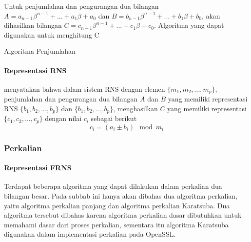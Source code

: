 Untuk penjumlahan dan pengurangan dua bilangan $A = a_{n-1}\beta^{n-1}+...+a_{1}\beta+a_{0}$ dan $B = b_{n-1}\beta^{n-1}+...+b_{1}\beta+b_{0}$, akan dihasilkan bilangan $C = c_{n-1}\beta^{n-1}+...+c_{1}\beta+c_{0}$. Algoritma yang dapat digunakan untuk menghitung C

\begin{algorithm}
  \caption{Algoritma Penjumlahan}
    \label{alg:add}
  \begin{algorithmic}[1]
    \Statex
      \EndFor
      \State {}
    \EndFunction
  \end{algorithmic}
\end{algorithm}




\paragraph{Representasi RNS}

\citet{rns_sharoun} menyatakan bahwa dalam sistem RNS dengan elemen $\{m_1,m_2,...,m_p\}$, penjumlahan dan pengurangan dua bilangan $A$ dan $B$ yang memiliki representasi RNS $\{b_1,b_2,...,b_p\}$ dan $\{b_1,b_2,...,b_p\}$,  menghasilkan $C$ yang memiliki representasi $\{c_1,c_2,...,c_p\}$ dengan nilai $c_i$ sebagai berikut
\begin{equation}
    c_i = (a_i \pm b_i) \mod m_i
\end{equation}


\subsubsection{Perkalian} \label{sec:mul_theory}

\paragraph{Representasi FRNS}
Terdapat beberapa algoritma yang dapat dilakukan dalam perkalian dua bilangan besar. Pada subbab ini hanya akan dibahas dua algoritma perkalian, yaitu algoritma perkalian panjang dan algoritma perkalian Karatsuba. Dua algoritma tersebut dibahas karena algoritma perkalian dasar dibutuhkan untuk memahami dasar dari proses perkalian, sementara itu algoritma Karatsuba digunakan dalam implementasi perkalian pada OpenSSL.

